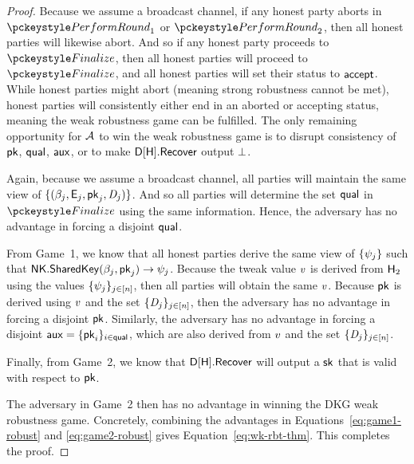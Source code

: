 \begin{proof}
Because we assume a broadcast channel,
if any honest party aborts in $\dkgkeygen_1$ or $\dkgkeygen_2$,
then all honest parties will likewise abort.
And so if any honest party proceeds to $\finalize$,
then all honest parties will proceed to $\finalize$,
and all honest parties will set their status to $\mathsf{accept}$.
While honest parties might abort (meaning strong robustness cannot be met),
honest parties will consistently either end in an aborted or accepting status,
meaning the weak robustness game can be fulfilled.
The only remaining opportunity for $\mathcal{A}$ to win the weak robustness game
is to disrupt consistency of $\mathsf{pk}$, $\mathsf{qual}$, $\mathsf{aux}$,
or to make $\mathsf{D}[\mathsf{H}].\mathsf{Recover}$ output $\bot$.

Again, because we assume a broadcast channel,
all parties will maintain the same view of $\{(\beta_j,\mathsf{E}_j,\mathsf{pk}_j,\textit{D}_j) \}$.
And so all parties will determine the set $\mathsf{qual}$ in $\finalize$ using the same information.
Hence, the adversary has no advantage in forcing a disjoint $\mathsf{qual}$.

From Game~1,
we know that all honest parties derive the same view of $\{ \psi_j \}$ such that $\mathsf{NK}.\mathsf{SharedKey}(\beta_j,\mathsf{pk}_j) \rightarrow \psi_j$.
Because the tweak value $v$ is derived from $\mathsf{H}_2$ using the values $\{\psi_j \}_{j \in [n]}$,
then all parties will obtain the same $v$.
Because $\mathsf{pk}$ is derived using $v$ and the set $\{\textit{D}_j \}_{j \in [n]}$,
then the adversary has no advantage in forcing a disjoint $\mathsf{pk}$.
Similarly,
the adversary has no advantage in forcing a disjoint $\mathsf{aux} = \{\mathsf{pk}_i \}_{i
\in \mathsf{qual}}$, which are also derived from $v$ and the set $\{\textit{D}_j \}_{j \in [n]}$.

Finally, from Game~2,
we know that $\mathsf{D}[\mathsf{H}].\mathsf{Recover}$ will output a $\mathsf{sk}$ that is valid with respect to $\mathsf{pk}$.

The adversary in Game~2 then has no advantage in winning the DKG weak robustness game.
Concretely, combining the advantages in
Equations~\ref{eq:game1-robust} and \ref{eq:game2-robust} gives Equation~\ref{eq:wk-rbt-thm}.
This completes the proof.
\end{proof}

